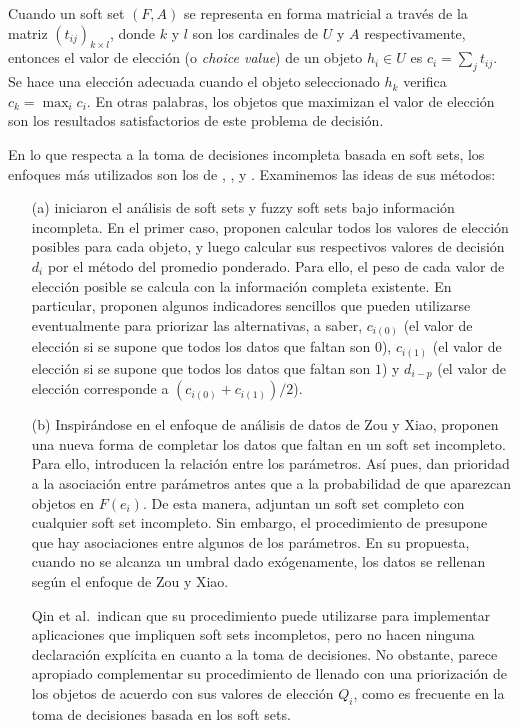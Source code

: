 Cuando un soft set $(F, A)$ se representa en forma matricial a través de la matriz $(t_{ij})_{k\times l}$, donde $k$ y $l$ son los cardinales de $U$ y $A$ respectivamente, entonces el valor de elección (o \emph{choice value}) de un objeto $h_i\in U$ es $c_i = \sum _{j} t_{ij}$. Se hace una elección adecuada cuando el objeto seleccionado $h_k$ verifica $c_k=\max _{i}c_i$. En otras palabras, los objetos que maximizan el valor de elección son los resultados satisfactorios de este problema de decisión.


En lo que respecta a la toma de decisiones incompleta basada en soft sets, los enfoques más utilizados son los de \citet{ZouXiao}, \citet{QinMaHerawanZain}, \citet{Hanetal} y \citet{AlcantudSantos17}. Examinemos las ideas de sus métodos:

\begin{enumerate}
\item[(a)] \citet{ZouXiao} iniciaron el análisis de soft sets y fuzzy soft sets bajo información incompleta. En el primer caso, proponen calcular todos los valores de elección posibles para cada objeto, y luego calcular sus respectivos valores de decisión $d_{i}$ por el método del promedio ponderado. Para ello, el peso de cada valor de elección posible se calcula con la información completa existente. En particular, proponen algunos indicadores sencillos que pueden utilizarse eventualmente para priorizar las alternativas, a saber, $c_{i(0)}$ (el valor de elección si se supone que todos los datos que faltan son $0$), $c_{i(1)}$ (el valor de elección si se supone que todos los datos que faltan son $1$) y $d_{i-p}$ (el valor de elección corresponde a $(c_{i(0)}+c_{i(1)})/2$). 

\item[(b)]  Inspirándose en el enfoque de análisis de datos de Zou y Xiao, \citet{QinMaHerawanZain} proponen una nueva forma de completar los datos que faltan en un soft set incompleto. Para ello, introducen la relación entre los parámetros. Así pues, dan prioridad a la asociación entre parámetros antes que a la probabilidad de que aparezcan objetos en $F(e_i)$. De esta manera, adjuntan un soft set completo con cualquier soft set incompleto. Sin embargo, el procedimiento de \citet{QinMaHerawanZain} presupone que hay asociaciones entre algunos de los parámetros. En su propuesta, cuando no se alcanza un umbral dado exógenamente, los datos se rellenan según el enfoque de Zou y Xiao. 

Qin et al.~indican que su procedimiento puede utilizarse para implementar aplicaciones que impliquen soft sets incompletos, pero no hacen ninguna declaración explícita en cuanto a la toma de decisiones. No obstante, parece apropiado complementar su procedimiento de llenado con una priorización de los objetos de acuerdo con sus valores de elección $Q_i$, como es frecuente en la toma de decisiones basada en los soft sets.


\end{enumerate}
